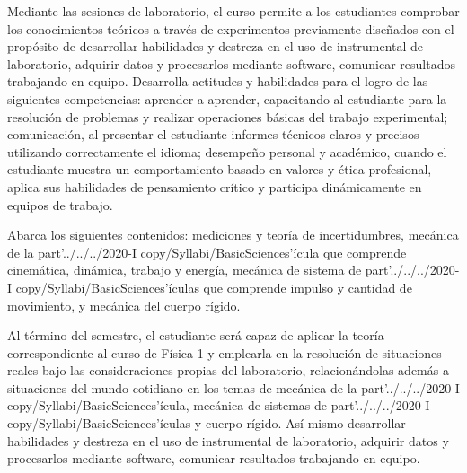 \begin{syllabus}


\begin{justification}
Mediante las sesiones de laboratorio, el curso permite a los estudiantes comprobar los conocimientos teóricos a través de experimentos previamente diseñados con el propósito de desarrollar habilidades y destreza en el uso de instrumental de laboratorio, adquirir datos y procesarlos mediante software, comunicar resultados trabajando en equipo. Desarrolla actitudes y habilidades para el logro de las siguientes competencias: aprender a aprender, capacitando al estudiante para la resolución de problemas y realizar operaciones básicas del trabajo experimental; comunicación, al presentar el estudiante informes técnicos claros y precisos utilizando correctamente el idioma; desempeño personal y académico, cuando el estudiante muestra un comportamiento basado en valores y ética profesional, aplica sus habilidades de pensamiento crítico y participa dinámicamente en equipos de trabajo.

Abarca los siguientes contenidos: mediciones y teoría de incertidumbres, mecánica de la part'../../../2020-I copy/Syllabi/BasicSciences'ícula que comprende cinemática, dinámica, trabajo y energía, mecánica de sistema de part'../../../2020-I copy/Syllabi/BasicSciences'ículas que comprende impulso y cantidad de movimiento, y mecánica del cuerpo rígido.
\end{justification}

\begin{goals}
\item Al término del semestre, el estudiante será capaz de aplicar la teoría correspondiente al curso de Física 1 y emplearla en la resolución de situaciones reales bajo las consideraciones propias del laboratorio, relacionándolas además a situaciones del mundo cotidiano en los temas de mecánica de la part'../../../2020-I copy/Syllabi/BasicSciences'ícula, mecánica de sistemas de part'../../../2020-I copy/Syllabi/BasicSciences'ículas y cuerpo rígido. Así mismo desarrollar habilidades y destreza en el uso de instrumental de laboratorio, adquirir datos y procesarlos mediante software, comunicar resultados trabajando en equipo.
\end{goals}

\begin{outcomes}
\item {}
\item {}
\end{outcomes}


\end{syllabus}
